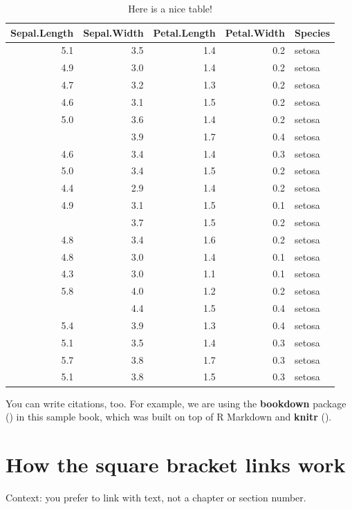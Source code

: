 \documentclass[
]{book}
\begin{document}
\begin{table}

\caption{\label{tab:nice-tab}Here is a nice table!}
\centering
\begin{tabular}[t]{rrrrl}
\toprule
Sepal.Length & Sepal.Width & Petal.Length & Petal.Width & Species\\
\midrule
5.1 & 3.5 & 1.4 & 0.2 & setosa\\
4.9 & 3.0 & 1.4 & 0.2 & setosa\\
4.7 & 3.2 & 1.3 & 0.2 & setosa\\
4.6 & 3.1 & 1.5 & 0.2 & setosa\\
5.0 & 3.6 & 1.4 & 0.2 & setosa\\
\addlinespace
5.4 & 3.9 & 1.7 & 0.4 & setosa\\
4.6 & 3.4 & 1.4 & 0.3 & setosa\\
5.0 & 3.4 & 1.5 & 0.2 & setosa\\
4.4 & 2.9 & 1.4 & 0.2 & setosa\\
4.9 & 3.1 & 1.5 & 0.1 & setosa\\
\addlinespace
5.4 & 3.7 & 1.5 & 0.2 & setosa\\
4.8 & 3.4 & 1.6 & 0.2 & setosa\\
4.8 & 3.0 & 1.4 & 0.1 & setosa\\
4.3 & 3.0 & 1.1 & 0.1 & setosa\\
5.8 & 4.0 & 1.2 & 0.2 & setosa\\
\addlinespace
5.7 & 4.4 & 1.5 & 0.4 & setosa\\
5.4 & 3.9 & 1.3 & 0.4 & setosa\\
5.1 & 3.5 & 1.4 & 0.3 & setosa\\
5.7 & 3.8 & 1.7 & 0.3 & setosa\\
5.1 & 3.8 & 1.5 & 0.3 & setosa\\
\bottomrule
\end{tabular}
\end{table}

You can write citations, too. For example, we are using the \textbf{bookdown} package () in this sample book, which was built on top of R Markdown and \textbf{knitr} ().

\section{How the square bracket links work}\label{how-the-square-bracket-links-work}

Context: you prefer to link with text, not a chapter or section number.
\end{document}
